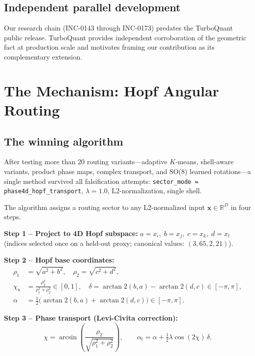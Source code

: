 \documentclass[11pt]{article}
\begin{document}
\subsection{Independent parallel development}

Our research chain (INC-0143 through INC-0173) predates the TurboQuant public release.
TurboQuant provides independent corroboration of the geometric fact at production scale
and motivates framing our contribution as its complementary extension.

\section{The Mechanism: Hopf Angular Routing}

\subsection{The winning algorithm}

After testing more than 20 routing variants---adaptive $K$-means, shell-aware variants,
product phase maps, complex transport, and SO(8) learned rotations---a single method
survived all falsification attempts: \texttt{sector\_mode = phase4d\_hopf\_transport},
$\lambda{=}1.0$, L2-normalization, single shell.

The algorithm assigns a routing sector to any L2-normalized input
$\mathbf{x} \in \mathbb{R}^D$ in four steps.

\textbf{Step 1 -- Project to 4D Hopf subspace:}
$a = x_{i},\; b = x_{j},\; c = x_{k},\; d = x_{l}$
(indices selected once on a held-out proxy; canonical values: $(3, 65, 2, 21)$).

\textbf{Step 2 -- Hopf base coordinates:}
\begin{align}
  \rho_1 &= \sqrt{a^2+b^2},\quad \rho_2 = \sqrt{c^2+d^2}, \nonumber\\
  \chi_u &= \frac{\rho_2^2}{\rho_1^2+\rho_2^2}\in[0,1], \quad
  \delta  = \arctan2(b,a)-\arctan2(d,c)\in[-\pi,\pi], \nonumber\\
  \alpha  &= \tfrac{1}{2}\bigl(\arctan2(b,a)+\arctan2(d,c)\bigr)\in[-\pi,\pi].
  \label{eq:hopf_coords}
\end{align}

\textbf{Step 3 -- Phase transport (Levi-Civita correction):}
\begin{equation}
  \chi = \arcsin\!\left(\frac{\rho_2}{\sqrt{\rho_1^2+\rho_2^2}}\right), \qquad
  \alpha_t = \alpha + \tfrac{1}{2}\lambda\cos(2\chi)\,\delta.
  \label{eq:transport}
\end{equation}
\end{document}
